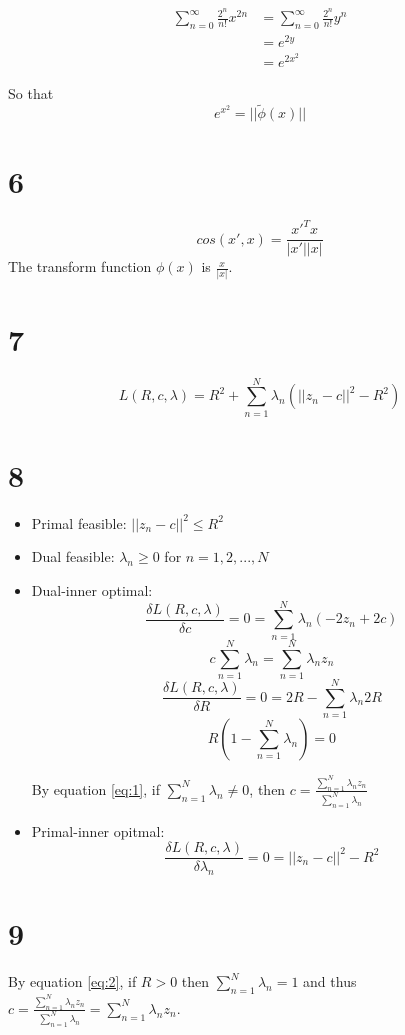 \documentclass[12pt]{article}
\begin{document}
\begin{equation*}
\begin{split}
\sum_{n=0}^\infty \frac{2^n}{n!} x^{2n} &= \sum_{n=0}^\infty \frac{2^n}{n!} y^{n} \\
&= e^{2y} \\
&= e^{2x^2}
\end{split}
\end{equation*}

So that 
\[  e^{x^2} = || \tilde{\phi}(x) ||\]

\section*{6}
\[ cos(x', x) = \frac{{x'}^Tx}{|x'||x|}\]
The transform function $\phi(x)$ is $\frac{x}{|x|}$. 

\section*{7}
\[ L(R, c, \lambda) = R^2 + \sum_{n=1}^N \lambda_n (||z_n - c||^2 - R^2) \]

\section*{8}
\begin{itemize}
\item Primal feasible: $||z_n - c||^2 \leq R^2$ 
\item Dual feasible: $\lambda_n \geq 0$ for $n = 1, 2, ..., N$
\item Dual-inner optimal: 
\[ \frac{\delta L(R, c, \lambda)}{\delta c} = 0 = \sum_{n=1}^N \lambda_n (-2z_n + 2c) \]
\begin{equation} \label{eq:1}
c \sum_{n=1}^N \lambda_n = \sum_{n=1}^N \lambda_n z_n 
\end{equation}
\[ \frac{\delta L(R, c, \lambda)}{\delta R} = 0 = 2R - \sum_{n=1}^N \lambda_n 2R \]
\begin{equation} \label{eq:2}
R(1 - \sum_{n=1}^N \lambda_n) = 0 
\end{equation}

By equation \ref{eq:1}, if $\sum_{n=1}^N \lambda_n \neq 0$, then $c = \frac{\sum_{n=1}^N \lambda_n z_n}{\sum_{n=1}^N \lambda_n}$

\item Primal-inner opitmal:
\[ \frac{\delta L(R, c, \lambda)}{\delta \lambda_n} = 0 = ||z_n - c||^2 - R^2  \]
\end{itemize}

\section*{9}
By equation \ref{eq:2}, if $R > 0$ then $\sum_{n=1}^N \lambda_n = 1$ and thus $c = \frac{\sum_{n=1}^N \lambda_n z_n}{\sum_{n=1}^N \lambda_n} = \sum_{n=1}^N \lambda_n z_n$.
\end{document}
